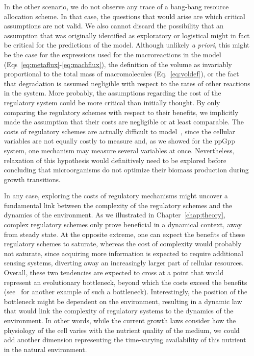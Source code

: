 In the other scenario, we do not observe any trace of a bang-bang resource allocation scheme.
In that case, the questions that would arise are which critical assumptions are not valid.
We also cannot discard the possibility that an assumption that was originally identified as exploratory or logistical might in fact be critical for the predictions of the model.
Although unlikely \textit{a priori}, this might be the case for the expressions used for the macroreactions in the model (Eqs~\ref{eq:metaflux}-\ref{eq:machflux}), the definition of the volume as invariably proportional to the total mass of macromolecules (Eq.~\ref{eq:voldef}), or the fact that degradation is assumed negligible with respect to the rates of other reactions in the system.
More probably, the assumptions regarding the cost of the regulatory system could be more critical than initially thought.
By only comparing the regulatory schemes with respect to their benefits, we implicitly made the assumption that their costs are negligible or at least comparable.
The costs of regulatory schemes are actually difficult to model~\cite{shachrai_cost_2010,dong_gratuitous_1995,dekel_environmental_2005}, since the cellular variables are not equally costly to measure and, as we showed for the ppGpp system, one mechanism may measure several variables at once.
Nevertheless, relaxation of this hypothesis would definitively need to be explored before concluding that microorganisms do not optimize their biomass production during growth transitions.

In any case, exploring the costs of regulatory mechanisms might uncover a fundamental link between the complexity of the regulatory schemes and the dynamics of the environment.
As we illustrated in Chapter~\ref{chap:theory}, complex regulatory schemes only prove beneficial in a dynamical context, away from steady state.
At the opposite extreme, one can expect the benefits of these regulatory schemes to saturate, whereas the cost of complexity would probably not saturate, since acquiring more information is expected to require additional sensing systems, diverting away an increasingly larger part of cellular resources.
Overall, these two tendencies are expected to cross at a point that would represent an evolutionary bottleneck, beyond which the costs exceed the benefits (see~\cite{short_flows_2006} for another example of such a bottleneck).
Interestingly, the position of the bottleneck might be dependent on the environment, resulting in a dynamic law that would link the complexity of regulatory systems to the dynamics of the environment.
In other words, while the current growth laws consider how the physiology of the cell varies with the nutrient quality of the medium, we could add another dimension representing the time-varying availability of this nutrient in the natural environment.